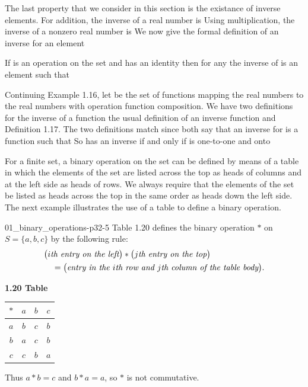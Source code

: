 \documentclass[11pt,oneside]{article}
\begin{document}
\begin{BookBody}

The last property that we consider in this section is the existance of inverse elements. For addition, the inverse of a real number  is  Using multiplication, the inverse of a nonzero real number  is  We now give the formal definition of an inverse for an element 

 If \BookInline{\ast } is an operation on the set  and  has an identity  then for any  the inverse of  is an element  such that \BookEnd{\blacksquare}

 Continuing Example 1.16, let  be the set of functions mapping the real numbers to the real numbers with operation function composition. We have two definitions for the inverse of a function  the usual definition of an inverse function and Definition 1.17. The two definitions match since both say that an inverse for  is a function  such that  So  has an inverse if and only if  is one-to-one and onto\BookEnd{\blacktriangle}


\noindent For a finite set, a binary operation on the set can be defined by means of a table in which the elements of the set are listed across the top as heads of columns and at the left side as heads of rows. We always require that the elements of the set be listed as heads across the top in the same order as heads down the left side. The next example illustrates the use of a table to define a binary operation.

\begin{BookFloat}{01_binary_operations-p32-5}
 Table 1.20 defines the binary operation $\ast$ on $S=\{a,b,c\}$ by the following rule:
\[
\begin{aligned}
&\bigl(i\text{\itshape th entry on the left}\bigr)\ast\bigl(j\text{\itshape th entry on the top}\bigr)\\
&\quad=\bigl(\text{\itshape entry in the }i\text{\itshape th row and }j\text{\itshape th column of the table body}\bigr).
\end{aligned}
\]
\begin{center}
\textbf{1.20 Table}\par\smallskip
\begin{tabular}{c|c|c|c}
$\ast$ & $a$ & $b$ & $c$\\\hline
$a$ & $b$ & $c$ & $b$\\\hline
$b$ & $a$ & $c$ & $b$\\\hline
$c$ & $c$ & $b$ & $a$
\end{tabular}
\end{center}
\noindent Thus $a\ast b=c$ and $b\ast a=a$, so $\ast$ is not commutative.\BookEnd{\blacktriangle}


\end{BookFloat}
\end{BookBody}
\end{document}
